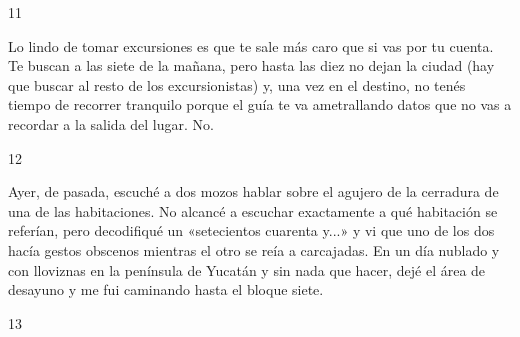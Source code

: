 \documentclass[12pt,twoside,openright,a5paper]{book}
\begin{document}
\vspace{0.5cm}

\hrulefill \hspace{0.1cm}\decofourleft\hspace{0.2cm} 11 \hspace{0.2cm}\decofourright \hspace{0.1cm}\hrulefill

\nopagebreak

\vspace{0.5cm}

\nopagebreak

Lo lindo de tomar excursiones es que te sale más caro que si vas por tu
cuenta. Te buscan a las siete de la mañana, pero hasta las diez no dejan la ciudad (hay que
buscar al resto de los excursionistas) y, una vez en el destino, no tenés
tiempo de recorrer tranquilo porque el guía te va ametrallando datos que
no vas a recordar a la salida del lugar. No.

\vspace{0.5cm}

\hrulefill \hspace{0.1cm}\decofourleft\hspace{0.2cm} 12 \hspace{0.2cm}\decofourright \hspace{0.1cm}\hrulefill

\nopagebreak

\vspace{0.5cm}

\nopagebreak

Ayer, de pasada, escuché a dos mozos hablar sobre el agujero de la cerradura de
una de las habitaciones. No alcancé a escuchar exactamente a qué habitación
se referían, pero decodifiqué un «setecientos cuarenta y...» y vi que uno
de los dos hacía gestos obscenos mientras el otro se reía a carcajadas. 
En un día nublado y con lloviznas en la península de Yucatán y sin nada 
que hacer, dejé el área de desayuno y me fui caminando hasta el bloque siete.

\vspace{0.5cm}

\hrulefill \hspace{0.1cm}\decofourleft\hspace{0.2cm} 13 \hspace{0.2cm}\decofourright \hspace{0.1cm}\hrulefill

\nopagebreak

\vspace{0.5cm}
\end{document}
